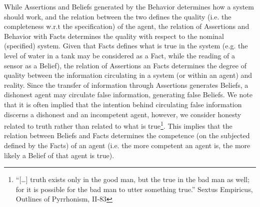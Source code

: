 While Assertions and Beliefs generated by the Behavior determines how a system should work, and the
relation between the two defines the quality (i.e. the completeness w.r.t the specification) of the agent, the relation of
Assertions and Behavior with Facts determines the quality with respect to the
nominal (specified) system.  Given that Facts defines what is true in the
system (e.g. the level of water in a tank may be considered as a Fact, while
the reading of a sensor as a Belief), the relation of Assertions an Facts
determines the degree of quality between the information circulating in a
system (or within an agent) and reality.  Since the transfer of information through Assertions
generates Beliefs, a dishonest agent may circulate false information,
generating false Beliefs.  We note that it is often implied that the intention behind
circulating false information discerns a dishonest and an incompetent agent,
however, we consider honesty related to truth rather than related to what is
true\footnote{``[\ldots] truth exists only in the good man, but the true in the bad
man as well; for it is possible for the bad man to utter something true.''
Sextus Empiricus, Outlines of Pyrrhonism, II-83\autocite{Empiricus1990Pyrrhonism}}.  This implies that the
relation between Beliefs and Facts determines the competence (on the subjected
defined by the Facts) of an agent (i.e. the more competent an agent is, the
more likely a Belief of that agent is true).



